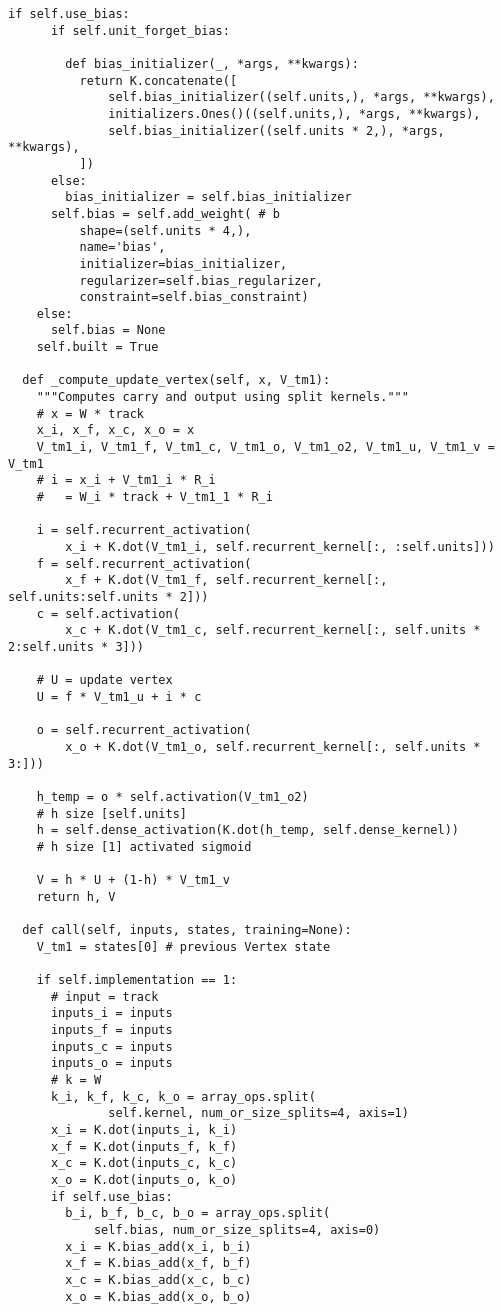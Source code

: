 \begin{lstlisting}[caption=独自のリカレントニューラルネットワーク構造の$1$ステップ, label=VLSTMCellSimple]
    if self.use_bias:
      if self.unit_forget_bias:

        def bias_initializer(_, *args, **kwargs):
          return K.concatenate([
              self.bias_initializer((self.units,), *args, **kwargs),
              initializers.Ones()((self.units,), *args, **kwargs),
              self.bias_initializer((self.units * 2,), *args, **kwargs),
          ])
      else:
        bias_initializer = self.bias_initializer
      self.bias = self.add_weight( # b
          shape=(self.units * 4,),
          name='bias',
          initializer=bias_initializer,
          regularizer=self.bias_regularizer,
          constraint=self.bias_constraint)
    else:
      self.bias = None
    self.built = True

  def _compute_update_vertex(self, x, V_tm1):
    """Computes carry and output using split kernels."""
    # x = W * track
    x_i, x_f, x_c, x_o = x
    V_tm1_i, V_tm1_f, V_tm1_c, V_tm1_o, V_tm1_o2, V_tm1_u, V_tm1_v = V_tm1
    # i = x_i + V_tm1_i * R_i
    #   = W_i * track + V_tm1_1 * R_i

    i = self.recurrent_activation(
        x_i + K.dot(V_tm1_i, self.recurrent_kernel[:, :self.units]))
    f = self.recurrent_activation(
        x_f + K.dot(V_tm1_f, self.recurrent_kernel[:, self.units:self.units * 2]))
    c = self.activation(
        x_c + K.dot(V_tm1_c, self.recurrent_kernel[:, self.units * 2:self.units * 3]))

    # U = update vertex
    U = f * V_tm1_u + i * c

    o = self.recurrent_activation(
        x_o + K.dot(V_tm1_o, self.recurrent_kernel[:, self.units * 3:]))

    h_temp = o * self.activation(V_tm1_o2)
    # h size [self.units]
    h = self.dense_activation(K.dot(h_temp, self.dense_kernel))
    # h size [1] activated sigmoid

    V = h * U + (1-h) * V_tm1_v
    return h, V

  def call(self, inputs, states, training=None):
    V_tm1 = states[0] # previous Vertex state

    if self.implementation == 1:
      # input = track
      inputs_i = inputs
      inputs_f = inputs
      inputs_c = inputs
      inputs_o = inputs
      # k = W
      k_i, k_f, k_c, k_o = array_ops.split(
              self.kernel, num_or_size_splits=4, axis=1)
      x_i = K.dot(inputs_i, k_i)
      x_f = K.dot(inputs_f, k_f)
      x_c = K.dot(inputs_c, k_c)
      x_o = K.dot(inputs_o, k_o)
      if self.use_bias:
        b_i, b_f, b_c, b_o = array_ops.split(
            self.bias, num_or_size_splits=4, axis=0)
        x_i = K.bias_add(x_i, b_i)
        x_f = K.bias_add(x_f, b_f)
        x_c = K.bias_add(x_c, b_c)
        x_o = K.bias_add(x_o, b_o)


\end{lstlisting}

